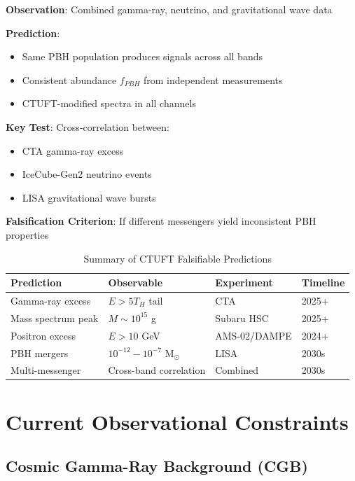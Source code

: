 \textbf{Observation}: Combined gamma-ray, neutrino, and gravitational wave data

\textbf{Prediction}: 
\begin{itemize}
    \item Same PBH population produces signals across all bands
    \item Consistent abundance $f_{PBH}$ from independent measurements
    \item CTUFT-modified spectra in all channels
\end{itemize}

\textbf{Key Test}: Cross-correlation between:
\begin{itemize}
    \item CTA gamma-ray excess
    \item IceCube-Gen2 neutrino events
    \item LISA gravitational wave bursts
\end{itemize}

\textbf{Falsification Criterion}: If different messengers yield inconsistent PBH properties

\begin{table}[htbp]
\centering
\caption{Summary of CTUFT Falsifiable Predictions}
\label{tab:predictions}
\begin{tabular}{@{}llll@{}}
\toprule
\textbf{Prediction} & \textbf{Observable} & \textbf{Experiment} & \textbf{Timeline} \\
\midrule
Gamma-ray excess & $E > 5T_H$ tail & CTA & 2025+ \\
Mass spectrum peak & $M \sim 10^{15}$ g & Subaru HSC & 2025+ \\
Positron excess & $E > 10$ GeV & AMS-02/DAMPE & 2024+ \\
PBH mergers & $10^{-12}-10^{-7}$ M$_\odot$ & LISA & 2030s \\
Multi-messenger & Cross-band correlation & Combined & 2030s \\
\bottomrule
\end{tabular}
\end{table}

\section{Current Observational Constraints}
\label{sec:current-constraints}

\subsection{Cosmic Gamma-Ray Background (CGB)}
\label{subsec:cgb-constraints}

